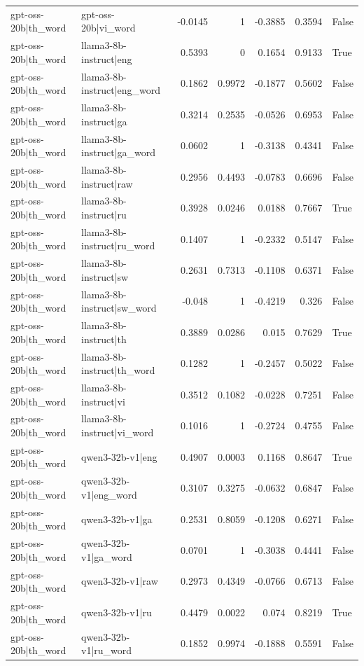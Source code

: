\begin{table}
\begin{tabular}{l l r r r r l}
gpt-oss-20b|th_word & gpt-oss-20b|vi_word & -0.0145 & 1 & -0.3885 & 0.3594 & False \\
gpt-oss-20b|th_word & llama3-8b-instruct|eng & 0.5393 & 0 & 0.1654 & 0.9133 & True \\
gpt-oss-20b|th_word & llama3-8b-instruct|eng_word & 0.1862 & 0.9972 & -0.1877 & 0.5602 & False \\
gpt-oss-20b|th_word & llama3-8b-instruct|ga & 0.3214 & 0.2535 & -0.0526 & 0.6953 & False \\
gpt-oss-20b|th_word & llama3-8b-instruct|ga_word & 0.0602 & 1 & -0.3138 & 0.4341 & False \\
gpt-oss-20b|th_word & llama3-8b-instruct|raw & 0.2956 & 0.4493 & -0.0783 & 0.6696 & False \\
gpt-oss-20b|th_word & llama3-8b-instruct|ru & 0.3928 & 0.0246 & 0.0188 & 0.7667 & True \\
gpt-oss-20b|th_word & llama3-8b-instruct|ru_word & 0.1407 & 1 & -0.2332 & 0.5147 & False \\
gpt-oss-20b|th_word & llama3-8b-instruct|sw & 0.2631 & 0.7313 & -0.1108 & 0.6371 & False \\
gpt-oss-20b|th_word & llama3-8b-instruct|sw_word & -0.048 & 1 & -0.4219 & 0.326 & False \\
gpt-oss-20b|th_word & llama3-8b-instruct|th & 0.3889 & 0.0286 & 0.015 & 0.7629 & True \\
gpt-oss-20b|th_word & llama3-8b-instruct|th_word & 0.1282 & 1 & -0.2457 & 0.5022 & False \\
gpt-oss-20b|th_word & llama3-8b-instruct|vi & 0.3512 & 0.1082 & -0.0228 & 0.7251 & False \\
gpt-oss-20b|th_word & llama3-8b-instruct|vi_word & 0.1016 & 1 & -0.2724 & 0.4755 & False \\
gpt-oss-20b|th_word & qwen3-32b-v1|eng & 0.4907 & 0.0003 & 0.1168 & 0.8647 & True \\
gpt-oss-20b|th_word & qwen3-32b-v1|eng_word & 0.3107 & 0.3275 & -0.0632 & 0.6847 & False \\
gpt-oss-20b|th_word & qwen3-32b-v1|ga & 0.2531 & 0.8059 & -0.1208 & 0.6271 & False \\
gpt-oss-20b|th_word & qwen3-32b-v1|ga_word & 0.0701 & 1 & -0.3038 & 0.4441 & False \\
gpt-oss-20b|th_word & qwen3-32b-v1|raw & 0.2973 & 0.4349 & -0.0766 & 0.6713 & False \\
gpt-oss-20b|th_word & qwen3-32b-v1|ru & 0.4479 & 0.0022 & 0.074 & 0.8219 & True \\
gpt-oss-20b|th_word & qwen3-32b-v1|ru_word & 0.1852 & 0.9974 & -0.1888 & 0.5591 & False \\

\end{tabular}
\end{table}
